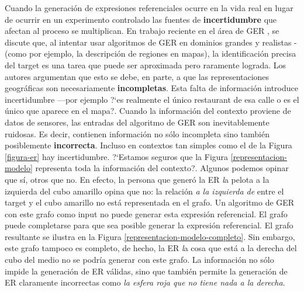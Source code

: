 Cuando la generaci\'on de expresiones referenciales ocurre en la vida real
en lugar de ocurrir en un experimento controlado las fuentes de \textbf{incertidumbre} que afectan al proceso se multiplican. En trabajo 
reciente en el \'area de GER \cite{turner2008}, \cite{turner2009} se discute que, al intentar usar algoritmos de GER en dominios grandes 
y realistas -(como por ejemplo, la descripci\'on de regiones en mapas), la identificaci\'on precisa del target es una tarea que puede ser 
aproximada pero raramente lograda. Los autores argumentan que esto se debe, en parte, a que las representaciones geogr\'aficas 
son necesariamente \textbf{incompletas}. Esta falta de informaci\'on introduce incertidumbre ---por ejemplo ?`es realmente el \'unico restaurant 
de esa calle o es el \'unico que aparece en el mapa?.
Cuando la informaci\'on del contexto proviene de datos de sensores, las entradas del algoritmo de GER son inevitablemente ruidosas. Es decir, 
contienen informaci\'on no s\'olo incompleta sino tambi\'en posiblemente {\bf incorrecta}. Incluso en contextos tan simples como el de la 
Figura \ref{figura-er} hay incertidumbre. ?`Estamos seguros que la Figura \ref{representacion-modelo} representa toda la informaci\'on del 
contexto?. Algunos podemos opinar que s\'i, otros que no. En efecto, la persona que gener\'o la ER {\emph la pelota a la izquierda del cubo 
amarillo} opina que no: la relaci\'on \emph{a la izquierda de} entre el target y el cubo amarillo no est\'a representada en el grafo. Un 
algoritmo de GER con este grafo como input no puede generar esta expresi\'on referencial. El grafo puede completarse para que sea posible
generar la expresi\'on referencial. El grafo resultante se ilustra en la Figura \ref{representacion-modelo-completo}. Sin embargo, este grafo tampoco es completo, 
de hecho, la ER {\emph la cosa que est\'a a la derecha del cubo del medio} no se podr\'ia generar con este grafo. La informaci\'on no s\'olo 
impide la generaci\'on de ER v\'alidas, sino que tambi\'en permite la generaci\'on de ER claramente incorrectas como \emph{la esfera roja 
que no tiene nada a la derecha}.

